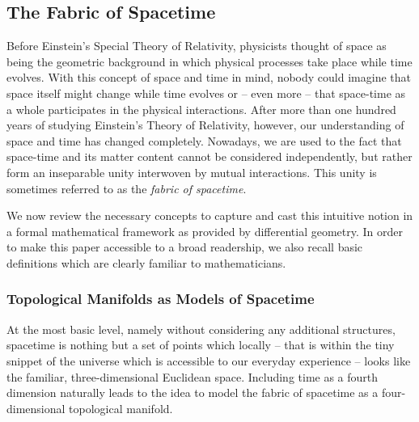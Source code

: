 \documentclass[reqno,11pt]{amsart}
\numberwithin{equation}{section}
\newcommand{\1}{\mbox{\rm 1 \hspace{-1.05 em} 1}}
\newcommand{\scrM}{\myscr M}
\begin{document}
\subsection{The Fabric of Spacetime}
Before Einstein's Special Theory of Relativity, physicists thought of space as being the 
geometric background in which physical processes take place while time evolves.
With this concept of space and time in mind, nobody could imagine that space itself
might change while time evolves or -- even more -- that space-time as a whole participates in the
physical interactions. After more than one hundred years of studying Einstein's Theory of Relativity, however, our understanding of space and time has changed completely.
Nowadays, we are used to the fact that space-time and its matter content 
cannot be considered independently, but rather form an inseparable unity
interwoven by mutual interactions. This unity is sometimes referred to as the \textit{fabric of spacetime}.

We now review the necessary concepts to capture and cast this intuitive notion in a formal mathematical
framework as provided by differential geometry.
In order to make this paper accessible to a broad readership, we also recall basic definitions
which are clearly familiar to mathematicians.





\subsubsection{Topological Manifolds as Models of Spacetime} At the most basic level, namely without considering any additional structures, spacetime is nothing but a set of points which locally -- that is within the tiny snippet of the universe which is accessible to our everyday experience -- looks like the familiar, three-dimensional Euclidean space. Including time as a fourth dimension naturally leads to the idea to model the fabric of spacetime as a four-dimensional topological manifold. 
\end{document}
